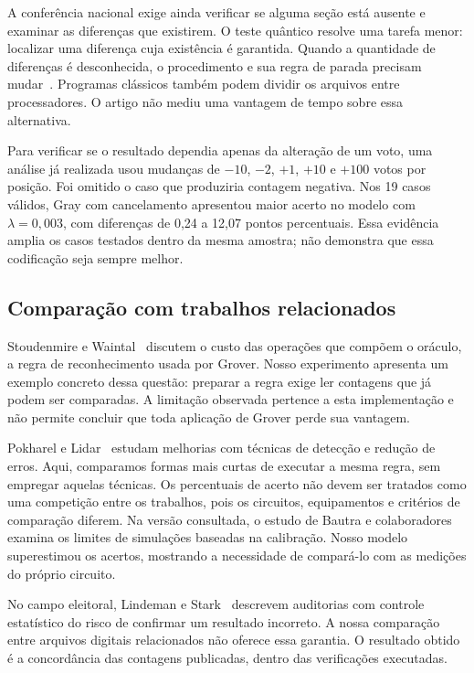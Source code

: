 A conferência nacional exige ainda verificar se alguma seção está ausente e examinar as diferenças que existirem. O teste quântico resolve uma tarefa menor: localizar uma diferença cuja existência é garantida. Quando a quantidade de diferenças é desconhecida, o procedimento e sua regra de parada precisam mudar~\cite{boyer1998}. Programas clássicos também podem dividir os arquivos entre processadores. O artigo não mediu uma vantagem de tempo sobre essa alternativa.

Para verificar se o resultado dependia apenas da alteração de um voto, uma análise já realizada usou mudanças de $-10$, $-2$, $+1$, $+10$ e $+100$ votos por posição. Foi omitido o caso que produziria contagem negativa. Nos 19 casos válidos, Gray com cancelamento apresentou maior acerto no modelo com $\lambda=0{,}003$, com diferenças de 0,24 a 12,07 pontos percentuais. Essa evidência amplia os casos testados dentro da mesma amostra; não demonstra que essa codificação seja sempre melhor.

\subsection{Comparação com trabalhos relacionados}
Stoudenmire e Waintal~\cite{stoudenmire2024} discutem o custo das operações que compõem o oráculo, a regra de reconhecimento usada por Grover. Nosso experimento apresenta um exemplo concreto dessa questão: preparar a regra exige ler contagens que já podem ser comparadas. A limitação observada pertence a esta implementação e não permite concluir que toda aplicação de Grover perde sua vantagem.

Pokharel e Lidar~\cite{pokharel2024} estudam melhorias com técnicas de detecção e redução de erros. Aqui, comparamos formas mais curtas de executar a mesma regra, sem empregar aquelas técnicas. Os percentuais de acerto não devem ser tratados como uma competição entre os trabalhos, pois os circuitos, equipamentos e critérios de comparação diferem. Na versão consultada, o estudo de Bautra e colaboradores~\cite{bautra2026} examina os limites de simulações baseadas na calibração. Nosso modelo superestimou os acertos, mostrando a necessidade de compará-lo com as medições do próprio circuito.

No campo eleitoral, Lindeman e Stark~\cite{lindeman2012} descrevem auditorias com controle estatístico do risco de confirmar um resultado incorreto. A nossa comparação entre arquivos digitais relacionados não oferece essa garantia. O resultado obtido é a concordância das contagens publicadas, dentro das verificações executadas.

